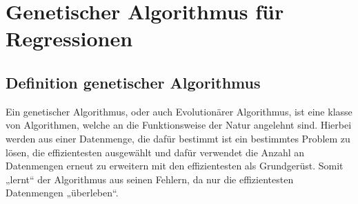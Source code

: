 \documentclass[a4paper,12pt]{article}
\begin{document}
\section{Genetischer Algorithmus für Regressionen}
\subsection{Definition genetischer Algorithmus}
Ein genetischer Algorithmus, oder auch Evolutionärer Algorithmus, ist eine klasse von Algorithmen, welche an die Funktionsweise der Natur angelehnt sind. Hierbei werden aus einer Datenmenge, die dafür bestimmt ist ein bestimmtes Problem zu lösen, die effizientesten ausgewählt und dafür verwendet die Anzahl an Datenmengen erneut zu erweitern mit  den effizientesten als Grundgerüst. Somit „lernt“ der Algorithmus aus seinen Fehlern, da nur die effizientesten Datenmengen „überleben“. 
\end{document}
